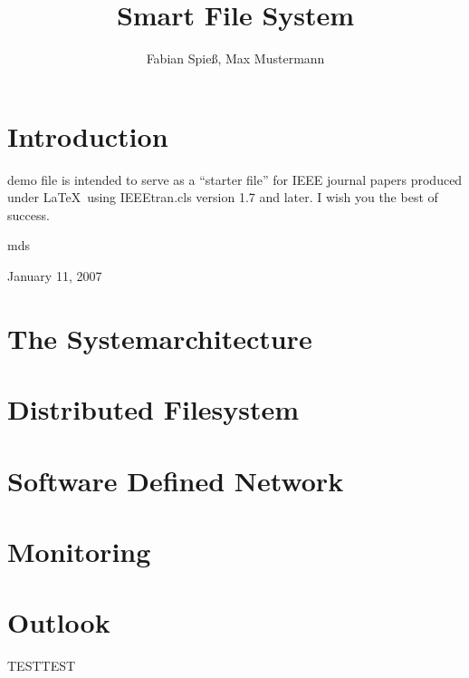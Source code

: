 \documentclass[journal]{IEEEtran}
\begin{document}
\title{Smart File System}

\author{Fabian Spie\ss, Max Mustermann}
        
\maketitle


\begin{abstract}

\end{abstract}

\IEEEpeerreviewmaketitle

\tableofcontents


\section{Introduction}
 demo file is intended to serve as a ``starter file''
for IEEE journal papers produced under \LaTeX\ using
IEEEtran.cls version 1.7 and later.
I wish you the best of success.

\hfill mds
 
\hfill January 11, 2007

\section{The Systemarchitecture}



\section{Distributed Filesystem}


\section{Software Defined Network}


\section{Monitoring}




\section{Outlook}

TESTTEST
\end{document}
